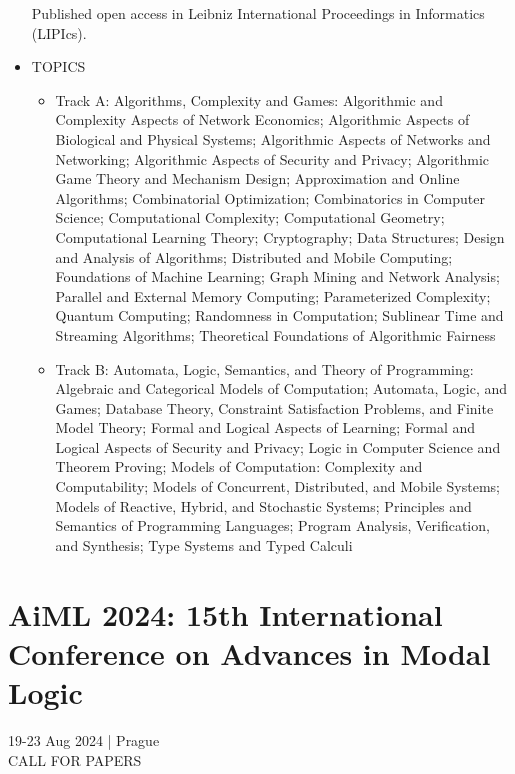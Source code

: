 \documentclass[prodmode,acmtecs]{acmsmall} %
\begin{document}
\begin{itemize}
  Published open access in Leibniz International Proceedings in Informatics (LIPIcs). 
 
\item  TOPICS 
 
\begin{itemize}\item  Track A: Algorithms, Complexity and Games: Algorithmic and Complexity Aspects of Network Economics; Algorithmic Aspects of Biological and Physical Systems; Algorithmic Aspects of Networks and Networking; Algorithmic Aspects of Security and Privacy; Algorithmic Game Theory and Mechanism Design; Approximation and Online Algorithms; Combinatorial Optimization; Combinatorics in Computer Science; Computational Complexity; Computational Geometry; Computational Learning Theory; Cryptography; Data Structures; Design and Analysis of Algorithms; Distributed and Mobile Computing; Foundations of Machine Learning; Graph Mining and Network Analysis; Parallel and External Memory Computing; Parameterized Complexity; Quantum Computing; Randomness in Computation; Sublinear Time and Streaming Algorithms; Theoretical Foundations of Algorithmic Fairness
\item  Track B: Automata, Logic, Semantics, and Theory of Programming: Algebraic and Categorical Models of Computation; Automata, Logic, and Games; Database Theory, Constraint Satisfaction Problems, and Finite Model Theory; Formal and Logical Aspects of Learning; Formal and Logical Aspects of Security and Privacy; Logic in Computer Science and Theorem Proving; Models of Computation: Complexity and Computability; Models of Concurrent, Distributed, and Mobile Systems; Models of Reactive, Hybrid, and Stochastic Systems; Principles and Semantics of Programming Languages; Program Analysis, Verification, and Synthesis; Type Systems and Typed Calculi
\end{itemize} 
\end{itemize}\section{AiML 2024: 15th International Conference on Advances in Modal Logic}\label{AiML2024}  19-23 Aug 2024 | Prague\\ 
CALL FOR PAPERS 
\end{document}
